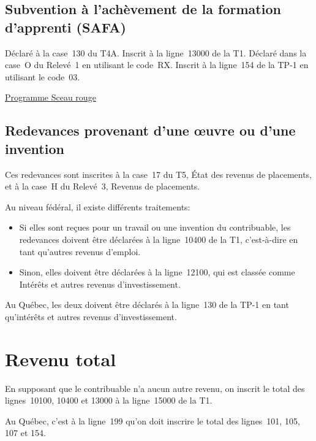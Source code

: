 \subsection{Subvention à l'achèvement de la formation d'apprenti (SAFA)}
Déclaré à la case~130 du T4A. Inscrit à la ligne~13000 de la T1. Déclaré dans la case~O du Relevé~1 en utilisant le code~RX. Inscrit à la ligne~154 de la TP-1 en utilisant le code~03.

\cat\href{https://www.red-seal.ca/fra/w.2lc.4m.2.shtml}{Programme Sceau rouge}


\subsection{Redevances provenant d'une œuvre ou d'une invention}
Ces redevances sont inscrites à la case~17 du T5, État des revenus de placements, et à la case~H du Relevé~3, Revenus de placements.

Au niveau fédéral, il existe différents traitements: 
\begin{itemize}
	\item Si elles sont reçues pour un travail ou une invention du contribuable, les redevances doivent être déclarées à la ligne~10400 de la T1, c'est-à-dire en tant qu'autres revenus d'emploi.
	\item Sinon, elles doivent être déclarées à la ligne~12100, qui est classée comme Intérêts et autres revenus d'investissement.
\end{itemize}

Au Québec, les deux doivent être déclarés à la ligne~130 de la TP-1 en tant qu'intérêts et autres revenus d'investissement.



\section{Revenu total}
En supposant que le contribuable n'a aucun autre revenu, on inscrit le total des lignes~10100, 10400 et 13000 à la ligne~15000 de la T1.

Au Québec, c'est à la ligne~199 qu'on doit inscrire le total des lignes~101, 105, 107 et 154.



